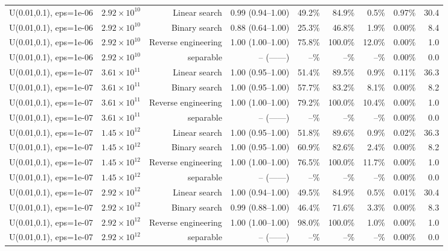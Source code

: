 \begin{tabular}{llrrrrrrr}
U(0.01,0.1), eps=1e-06 & $2.92\times 10^{10}$ & Linear search & 0.99 (0.94--1.00) & 49.2\% & 84.9\% & 0.5\% & 0.97\% & 30.4 \\
U(0.01,0.1), eps=1e-06 & $2.92\times 10^{10}$ & Binary search & 0.88 (0.64--1.00) & 25.3\% & 46.8\% & 1.9\% & 0.00\% & 8.4 \\
U(0.01,0.1), eps=1e-06 & $2.92\times 10^{10}$ & Reverse engineering & 1.00 (1.00--1.00) & 75.8\% & 100.0\% & 12.0\% & 0.00\% & 1.0 \\
U(0.01,0.1), eps=1e-06 & $2.92\times 10^{10}$ & separable & -- (------) & --\% & --\% & --\% & 0.00\% & 0.0 \\
U(0.01,0.1), eps=1e-07 & $3.61\times 10^{11}$ & Linear search & 1.00 (0.95--1.00) & 51.4\% & 89.5\% & 0.9\% & 0.11\% & 36.3 \\
U(0.01,0.1), eps=1e-07 & $3.61\times 10^{11}$ & Binary search & 1.00 (0.95--1.00) & 57.7\% & 83.2\% & 8.1\% & 0.00\% & 8.2 \\
U(0.01,0.1), eps=1e-07 & $3.61\times 10^{11}$ & Reverse engineering & 1.00 (1.00--1.00) & 79.2\% & 100.0\% & 10.4\% & 0.00\% & 1.0 \\
U(0.01,0.1), eps=1e-07 & $3.61\times 10^{11}$ & separable & -- (------) & --\% & --\% & --\% & 0.00\% & 0.0 \\
U(0.01,0.1), eps=1e-07 & $1.45\times 10^{12}$ & Linear search & 1.00 (0.95--1.00) & 51.8\% & 89.6\% & 0.9\% & 0.02\% & 36.3 \\
U(0.01,0.1), eps=1e-07 & $1.45\times 10^{12}$ & Binary search & 1.00 (0.95--1.00) & 60.9\% & 82.6\% & 2.4\% & 0.00\% & 8.2 \\
U(0.01,0.1), eps=1e-07 & $1.45\times 10^{12}$ & Reverse engineering & 1.00 (1.00--1.00) & 76.5\% & 100.0\% & 11.7\% & 0.00\% & 1.0 \\
U(0.01,0.1), eps=1e-07 & $1.45\times 10^{12}$ & separable & -- (------) & --\% & --\% & --\% & 0.00\% & 0.0 \\
U(0.01,0.1), eps=1e-07 & $2.92\times 10^{12}$ & Linear search & 1.00 (0.94--1.00) & 49.5\% & 84.9\% & 0.5\% & 0.01\% & 30.4 \\
U(0.01,0.1), eps=1e-07 & $2.92\times 10^{12}$ & Binary search & 0.99 (0.88--1.00) & 46.4\% & 71.6\% & 3.3\% & 0.00\% & 8.3 \\
U(0.01,0.1), eps=1e-07 & $2.92\times 10^{12}$ & Reverse engineering & 1.00 (1.00--1.00) & 98.0\% & 100.0\% & 1.0\% & 0.00\% & 1.0 \\
U(0.01,0.1), eps=1e-07 & $2.92\times 10^{12}$ & separable & -- (------) & --\% & --\% & --\% & 0.00\% & 0.0 \\

\end{tabular}
